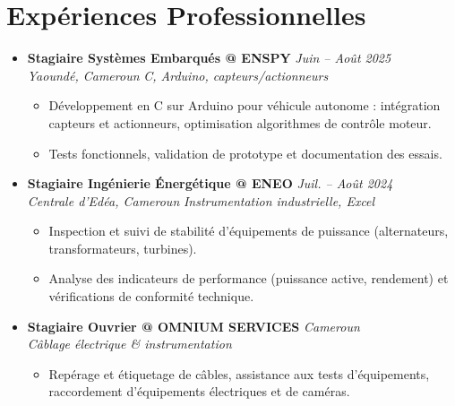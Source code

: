 \documentclass[a4paper,11pt]{article}
\begin{document}
\begin{itemize}[leftmargin=*, label={-}]
\end{itemize}

\section{Expériences Professionnelles}
\begin{itemize}[leftmargin=*, label={-}]

\item \textbf{Stagiaire Systèmes Embarqués @ ENSPY} \hfill \textit{Juin -- Août 2025} \\
\textit{Yaoundé, Cameroun} \hfill \textit{C, Arduino, capteurs/actionneurs}
\vspace{-2pt}
    \begin{itemize}[leftmargin=0.4cm, nosep, label=\tiny$\bullet$]
        \item \small{Développement en C sur Arduino pour véhicule autonome : intégration capteurs et actionneurs, optimisation algorithmes de contrôle moteur.}
        \item \small{Tests fonctionnels, validation de prototype et documentation des essais.}
    \end{itemize}
\vspace{3pt}

\item \textbf{Stagiaire Ingénierie Énergétique @ ENEO} \hfill \textit{Juil. -- Août 2024} \\
\textit{Centrale d'Edéa, Cameroun} \hfill \textit{Instrumentation industrielle, Excel}
\vspace{-2pt}
    \begin{itemize}[leftmargin=0.4cm, nosep, label=\tiny$\bullet$]
        \item \small{Inspection et suivi de stabilité d'équipements de puissance (alternateurs, transformateurs, turbines).}
        \item \small{Analyse des indicateurs de performance (puissance active, rendement) et vérifications de conformité technique.}
    \end{itemize}
\vspace{3pt}

\item \textbf{Stagiaire Ouvrier @ OMNIUM SERVICES} \hfill \textit{Cameroun} \\
\textit{Câblage électrique \& instrumentation}
\vspace{-2pt}
    \begin{itemize}[leftmargin=0.4cm, nosep, label=\tiny$\bullet$]
        \item \small{Repérage et étiquetage de câbles, assistance aux tests d'équipements, raccordement d'équipements électriques et de caméras.}
    \end{itemize}

\end{itemize}
\end{document}
